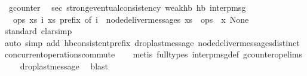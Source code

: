 \begin{isabellebody}
\isanewline
{}\isamarkupfalse%
\ gcounter\ \isanewline
\isanewline
{}\isamarkupfalse%
\ sec{\isacharcolon}\ strong{\isacharunderscore}eventual{\isacharunderscore}consistency\ weak{\isacharunderscore}hb\ hb\ interp{\isacharunderscore}msg\isanewline
\ \ {\isachardoublequoteopen}{\isasymlambda}ops{\isachardot}\ {\isasymexists}xs\ i{\isachardot}\ xs\ prefix\ of\ i\ {\isasymand}\ node{\isacharunderscore}deliver{\isacharunderscore}messages\ xs\ {\isacharequal}\ ops{\isachardoublequoteclose}\ {\isachardoublequoteopen}{\isasymlambda}\ x{\isachardot}\ None{\isachardoublequoteclose}\isanewline
%
\isadelimproof
\ \ %
\endisadelimproof
%
\isatagproof
{}\isamarkupfalse%
{\isacharparenleft}standard{\isacharsemicolon}\ clarsimp{\isacharparenright}\isanewline
\ \ \ \ \ \ \isamarkupfalse%
{\isacharparenleft}auto\ simp\ add{\isacharcolon}\ hb{\isacharunderscore}consistent{\isacharunderscore}prefix\ drop{\isacharunderscore}last{\isacharunderscore}message\ node{\isacharunderscore}deliver{\isacharunderscore}messages{\isacharunderscore}distinct\ concurrent{\isacharunderscore}operations{\isacharunderscore}commute{\isacharparenright}\isanewline
\ \ \ \isamarkupfalse%
{\isacharparenleft}metis\ {\isacharparenleft}full{\isacharunderscore}types{\isacharparenright}\ interp{\isacharunderscore}msg{\isacharunderscore}def\ gcounter{\isacharunderscore}op{\isachardot}elims{\isacharparenright}\isanewline
\ \ \isamarkupfalse%
\ drop{\isacharunderscore}last{\isacharunderscore}message\ \isamarkupfalse%
\ blast\isanewline
\ \ \isamarkupfalse%
%
\endisatagproof
{\isafoldproof}%
%
\isadelimproof
\isanewline
%
\endisadelimproof
{}\isamarkupfalse%
\isanewline
%
\isadelimtheory
\isanewline
%
\endisadelimtheory
%
\isatagtheory
{}\isamarkupfalse%
%
\endisatagtheory
{\isafoldtheory}%
%
\isadelimtheory
%
\endisadelimtheory
%
\end{isabellebody}
